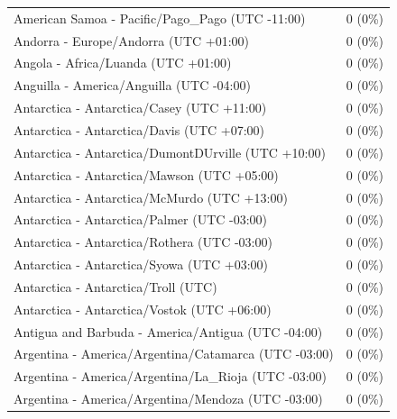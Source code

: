 \documentclass[
  english,
  man]{apa6}
\begin{document}
\begin{appendix}
\begin{table}
{\begin{tabular}[t]{ll}
\hspace{1em}American Samoa - Pacific/Pago\_Pago (UTC -11:00) & 0 (0\%)\\
\hspace{1em}Andorra - Europe/Andorra (UTC +01:00) & 0 (0\%)\\
\hspace{1em}Angola - Africa/Luanda (UTC +01:00) & 0 (0\%)\\
\addlinespace
\hspace{1em}Anguilla - America/Anguilla (UTC -04:00) & 0 (0\%)\\
\hspace{1em}Antarctica - Antarctica/Casey (UTC +11:00) & 0 (0\%)\\
\hspace{1em}Antarctica - Antarctica/Davis (UTC +07:00) & 0 (0\%)\\
\hspace{1em}Antarctica - Antarctica/DumontDUrville (UTC +10:00) & 0 (0\%)\\
\hspace{1em}Antarctica - Antarctica/Mawson (UTC +05:00) & 0 (0\%)\\
\addlinespace
\hspace{1em}Antarctica - Antarctica/McMurdo (UTC +13:00) & 0 (0\%)\\
\hspace{1em}Antarctica - Antarctica/Palmer (UTC -03:00) & 0 (0\%)\\
\hspace{1em}Antarctica - Antarctica/Rothera (UTC -03:00) & 0 (0\%)\\
\hspace{1em}Antarctica - Antarctica/Syowa (UTC +03:00) & 0 (0\%)\\
\hspace{1em}Antarctica - Antarctica/Troll (UTC) & 0 (0\%)\\
\addlinespace
\hspace{1em}Antarctica - Antarctica/Vostok (UTC +06:00) & 0 (0\%)\\
\hspace{1em}Antigua and Barbuda - America/Antigua (UTC -04:00) & 0 (0\%)\\
\hspace{1em}Argentina - America/Argentina/Catamarca (UTC -03:00) & 0 (0\%)\\
\hspace{1em}Argentina - America/Argentina/La\_Rioja (UTC -03:00) & 0 (0\%)\\
\hspace{1em}Argentina - America/Argentina/Mendoza (UTC -03:00) & 0 (0\%)\\

\end{tabular}}
\end{table}
\end{appendix}
\end{document}
